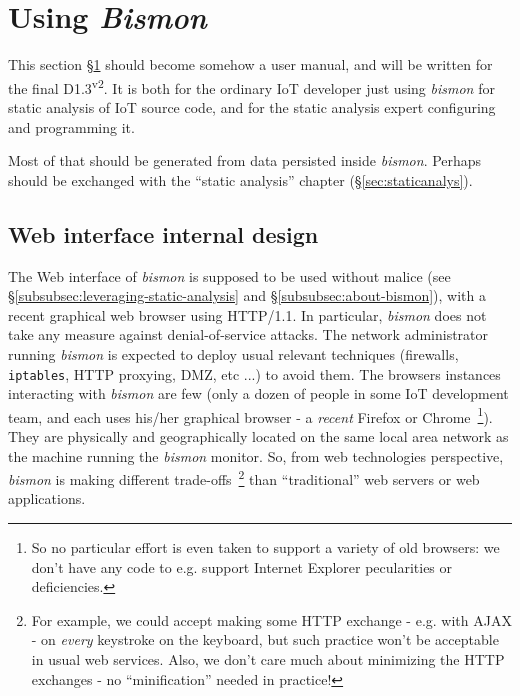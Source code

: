 \section{Using \emph{Bismon}}
\label{sec:using}

This section §\ref{sec:using} should become somehow a user manual, and
will be written for the final D1.3\textsuperscript{v2}. It is both for
the ordinary IoT developer just using \emph{bismon} for static
analysis of IoT source code, and for the static analysis expert
configuring and programming it.

Most of that should be generated from data persisted inside \emph{bismon}. Perhaps
should be exchanged with the ``static analysis'' chapter
(§\ref{sec:staticanalys}).




\subsection{Web interface internal design}
\label{subsec:webinterf}

The Web interface  of \emph{bismon} is supposed
to be used without malice (see
§\ref{subsubsec:leveraging-static-analysis} and
§\ref{subsubsec:about-bismon}), with a recent graphical web browser
using HTTP/1.1. In particular, \emph{bismon} does not take any measure
against denial-of-service attacks. The network administrator running
\emph{bismon} is expected to deploy usual relevant techniques
(firewalls, \texttt{iptables}, HTTP proxying, DMZ, etc ...) to avoid
them. The browsers instances interacting with \emph{bismon} are few
(only a dozen of people in some IoT development team, and each uses
his/her graphical browser - a \emph{recent} Firefox or
Chrome~\footnote{So no particular effort is even taken to support a
  variety of old browsers: we don't have any code to e.g. support
  Internet Explorer pecularities or deficiencies.}). They are
physically and geographically located on the same local area network
as the machine running the \emph{bismon} monitor. So, from web
technologies perspective, \emph{bismon} is making different
trade-offs~\footnote{For example, we could accept making some HTTP
  exchange - e.g. with AJAX - on \emph{every} keystroke on the
  keyboard, but such practice won't be acceptable in usual web
  services. Also, we don't care much about minimizing the HTTP
  exchanges - no ``minification'' needed in practice!} than
``traditional'' web servers or web applications.

